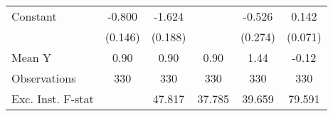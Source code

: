 {\begin{tabular}{l*{5}{c}}
\addlinespace
Constant            &      -0.800\sym{***}&      -1.624\sym{***}&                     &      -0.526\sym{*}  &       0.142\sym{*}  \\
                    &     (0.146)         &     (0.188)         &                     &     (0.274)         &     (0.071)         \\
\midrule
Mean Y              &        0.90         &        0.90         &        0.90         &        1.44         &       -0.12         \\
Observations        &         330         &         330         &         330         &         330         &         330         \\
Exc. Inst. F-stat   &                     &      47.817         &      37.785         &      39.659         &      79.591         \\
\bottomrule
\end{tabular}
}
